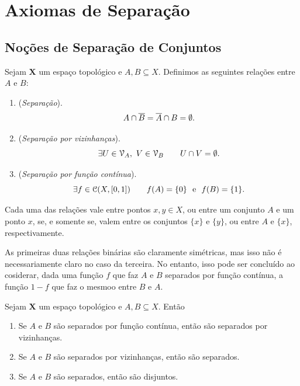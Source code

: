 \chapter{Axiomas de Separação}

\section{Noções de Separação de Conjuntos}

\begin{defi}
	Sejam $\bm X$ um espaço topológico e $A,B \subseteq X$. Definimos as seguintes relações entre $A$ e $B$:
	\begin{enumerate}
	\item (\emph{Separação}).
	\begin{equation*}
	A \cap \overline{B} = \overline{A} \cap B = \emptyset.
	\end{equation*}
	\item (\emph{Separação por vizinhanças}).
	\begin{equation*}
	\exists U \in \mathcal{V}_A,\ V \in \mathcal{V}_B \qquad U \cap V = \emptyset.
	\end{equation*}
	\item (\emph{Separação por função contínua}).
	\begin{equation*}
	\exists f \in \mathcal{C}(X,[0,1]) \qquad f(A)=\{0\} \text{\ \ e\ \ } f(B)=\{1\}.
	\end{equation*}
	\end{enumerate}
Cada uma das relações vale entre pontos $x,y \in X$, ou entre um conjunto $A$ e um ponto $x$, se, e somente se, valem entre os conjuntos $\{x\}$ e $\{y\}$, ou entre $A$ e $\{x\}$, respectivamente.
\end{defi}

	As primeiras duas relações binárias são claramente simétricas, mas isso não é necessariamente claro no caso da terceira. No entanto, isso pode ser concluído ao cosiderar, dada uma função $f$ que faz $A$ e $B$ separados por função contínua, a função $1-f$ que faz o mesmoo entre $B$ e $A$.

\begin{prop}
	Sejam $\bm X$ um espaço topológico e $A,B \subseteq X$. Então
	\begin{enumerate}
	\item Se $A$ e $B$ são separados por função contínua, então são separados por vizinhanças.
	\item Se $A$ e $B$ são separados por vizinhanças, então são separados.
	\item Se $A$ e $B$ são separados, então são disjuntos.
	\end{enumerate}
\end{prop}

